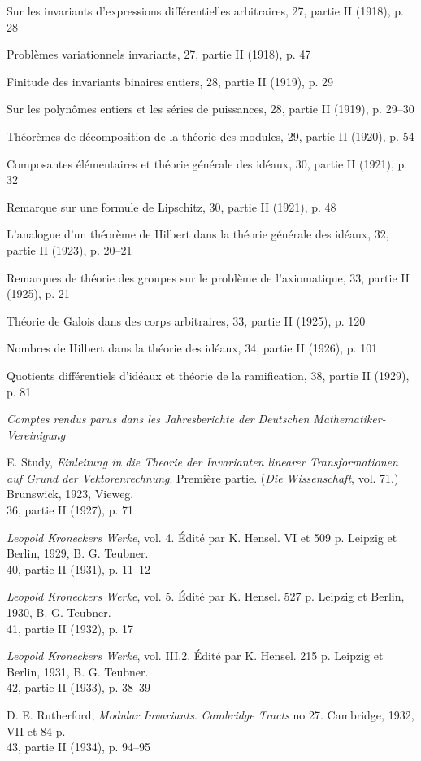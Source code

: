 \begingroup
\setlength{\parindent}{0pt}
\setlength{\parskip}{0.15em}
Sur les invariants d'expressions différentielles arbitraires, 27, partie II (1918), p. 28\par
Problèmes variationnels invariants, 27, partie II (1918), p. 47\par
Finitude des invariants binaires entiers, 28, partie II (1919), p. 29\par
Sur les polynômes entiers et les séries de puissances, 28, partie II (1919), p. 29--30\par
Théorèmes de décomposition de la théorie des modules, 29, partie II (1920), p. 54\par
Composantes élémentaires et théorie générale des idéaux, 30, partie II (1921), p. 32\par
Remarque sur une formule de Lipschitz, 30, partie II (1921), p. 48\par
L'analogue d'un théorème de Hilbert dans la théorie générale des idéaux, 32, partie II (1923), p. 20--21\par
Remarques de théorie des groupes sur le problème de l'axiomatique, 33, partie II (1925), p. 21\par
Théorie de Galois dans des corps arbitraires, 33, partie II (1925), p. 120\par
Nombres de Hilbert dans la théorie des idéaux, 34, partie II (1926), p. 101\par
Quotients différentiels d'idéaux et théorie de la ramification, 38, partie II (1929), p. 81\par
\endgroup

\begin{center}
\emph{Comptes rendus parus dans les Jahresberichte der Deutschen Mathematiker-Vereinigung}
\end{center}

\begingroup
\setlength{\parindent}{0pt}
\setlength{\parskip}{0.35em}
E. Study, \emph{Einleitung in die Theorie der Invarianten linearer Transformationen auf Grund der Vektorenrechnung}. Première partie. (\emph{Die Wissenschaft}, vol. 71.) Brunswick, 1923, Vieweg.\\
36, partie II (1927), p. 71\par
\emph{Leopold Kroneckers Werke}, vol. 4. Édité par K. Hensel. VI et 509 p. Leipzig et Berlin, 1929, B. G. Teubner.\\
40, partie II (1931), p. 11--12\par
\emph{Leopold Kroneckers Werke}, vol. 5. Édité par K. Hensel. 527 p. Leipzig et Berlin, 1930, B. G. Teubner.\\
41, partie II (1932), p. 17\par
\emph{Leopold Kroneckers Werke}, vol. III.2. Édité par K. Hensel. 215 p. Leipzig et Berlin, 1931, B. G. Teubner.\\
42, partie II (1933), p. 38--39\par
D. E. Rutherford, \emph{Modular Invariants}. \emph{Cambridge Tracts} no 27. Cambridge, 1932, VII et 84 p.\\
43, partie II (1934), p. 94--95\par
\endgroup

